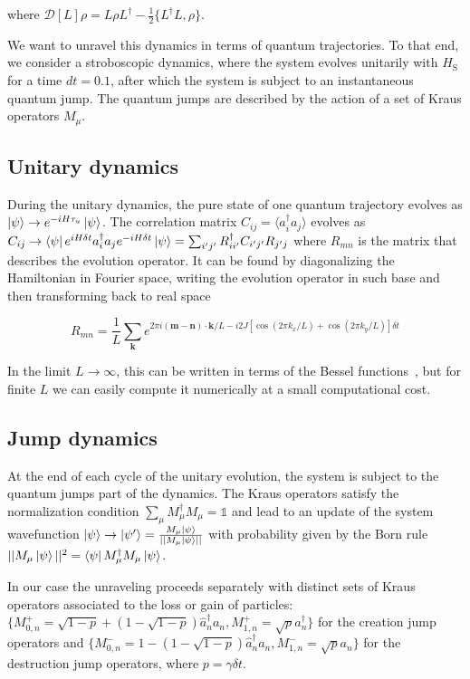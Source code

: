 \documentclass[reprint, superscriptaddress, aps, prl]{revtex4-2}
\begin{document}
where $\mathcal{D}[L]\rho=L\rho L^\dagger-\frac{1}{2}\{L^\dagger L,\rho\}$.

We want to unravel this dynamics in terms of quantum trajectories. To that end, we consider a stroboscopic dynamics, where the system evolves unitarily with $H_{\text{S}}$ for a time $dt=0.1$, after which the system is subject to an instantaneous quantum jump. The quantum jumps are described by the action of a set of Kraus operators $M_\mu$.

\subsection{Unitary dynamics}

During the unitary dynamics, the pure state of one quantum trajectory evolves as $\ket{\psi}\rightarrow e^{-iH\tau_u}\ket{\psi}$. The correlation matrix  $C_{ij}=\langle a_i^{\dagger}a_j\rangle$ evolves as $C_{ij}\rightarrow\bra{\psi}e^{iH\delta t}a_i^{\dagger}a_je^{-iH\delta t}\ket{\psi}=\sum_{i'j'}R_{ii'}^{\dagger}C_{i'j'}R_{j'j}$ where $R_{mn}$ is the matrix that describes the evolution operator. It can be found by diagonalizing the Hamiltonian in Fourier space, writing the evolution operator in such base and then transforming back to real space

\begin{equation}
    R_{mn}=\frac1L\sum_{\mathbf k}e^{2\pi i(\mathbf{ m}-\mathbf{n})\cdot \mathbf{k}/L-i2J[\cos(2\pi k_x/L)+\cos(2\pi k_y/L)]\delta t}
\end{equation}

In the limit $L\rightarrow\infty$, this can be written in terms of the Bessel functions~\cite{CoppolaCollura2022}, but for finite $L$ we can easily compute it numerically at a small computational cost.

\subsection{Jump dynamics}

At the end of each cycle of the unitary evolution, the system is subject to the quantum jumps part of the dynamics. The Kraus operators satisfy the normalization condition $\sum_\mu M^{\dagger}_\mu M_\mu=\mathbb1$ and lead to an update of the system wavefunction $\ket{\psi}\rightarrow\ket{\psi'}=\frac{M_\mu\ket{\psi}}{||M_\mu\ket{\psi}||}$ with probability given by the Born rule $||M_\mu\ket{\psi}||^2=\bra{\psi}M^{\dagger}_\mu M_\mu\ket{\psi}$.

In our case the unraveling proceeds separately with distinct sets of Kraus operators associated to the loss or gain of particles: $\{M^+_{0,n}=\sqrt{1-p}+(1-\sqrt{1-p})\hat a_n^{\dagger}a_n, M^+_{1,n}=\sqrt{p}a_n^{\dagger}\}$ for the creation jump operators and $\{M^-_{0,n}=1-(1-\sqrt{1-p})\hat a_n^\dagger a_n, M^-_{1,n}=\sqrt{p}a_n\}$ for the destruction jump operators, where $p=\gamma\delta t$.
\end{document}
